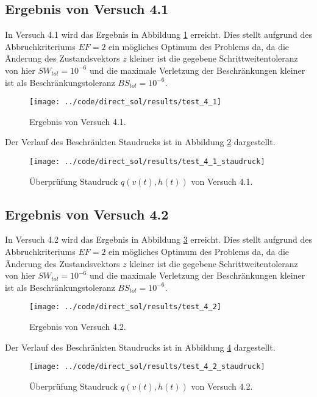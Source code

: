 \subsection{Ergebnis von Versuch 4.1}\label{kap:Versuch41}
In Versuch 4.1 wird das Ergebnis in Abbildung \ref{img:test_4_1} erreicht. Dies stellt aufgrund des Abbruchkriteriums $EF = 2$ ein mögliches Optimum des Problems da, da die Änderung des Zustandsvektors $z$ kleiner ist die gegebene Schrittweitentoleranz von hier $SW_{tol} = 10^{-6}$ und die maximale Verletzung der Beschränkungen kleiner ist als Beschränkungstoleranz $BS_{tol} = 10^{-6}$.
\begin{figure}[H]
\begin{center}
\texttt{[image: ../code/direct\_sol/results/test\_4\_1]}
\caption{Ergebnis von Versuch 4.1.}\label{img:test_4_1}
\end{center}
\end{figure}
Der Verlauf des Beschränkten Staudrucks ist in Abbildung \ref{img:test_4_1_staudruck} dargestellt.
\begin{figure}[H]
\begin{center}
\texttt{[image: ../code/direct\_sol/results/test\_4\_1\_staudruck]}
\caption{Überprüfung Staudruck $q(v(t),h(t))$ von Versuch 4.1.}\label{img:test_4_1_staudruck}
\end{center}
\end{figure}




\subsection{Ergebnis von Versuch 4.2}\label{kap:Versuch42}
In Versuch 4.2 wird das Ergebnis in Abbildung \ref{img:test_4_2} erreicht. Dies stellt aufgrund des Abbruchkriteriums $EF = 2$ ein mögliches Optimum des Problems da, da die Änderung des Zustandsvektors $z$ kleiner ist die gegebene Schrittweitentoleranz von hier $SW_{tol} = 10^{-6}$ und die maximale Verletzung der Beschränkungen kleiner ist als Beschränkungstoleranz $BS_{tol} = 10^{-6}$.
\begin{figure}[H]
\begin{center}
\texttt{[image: ../code/direct\_sol/results/test\_4\_2]}
\caption{Ergebnis von Versuch 4.2.}\label{img:test_4_2}
\end{center}
\end{figure}
Der Verlauf des Beschränkten Staudrucks ist in Abbildung \ref{img:test_4_2_staudruck} dargestellt.
\begin{figure}[H]
\begin{center}
\texttt{[image: ../code/direct\_sol/results/test\_4\_2\_staudruck]}
\caption{Überprüfung Staudruck $q(v(t),h(t))$ von Versuch 4.2.}\label{img:test_4_2_staudruck}
\end{center}
\end{figure}